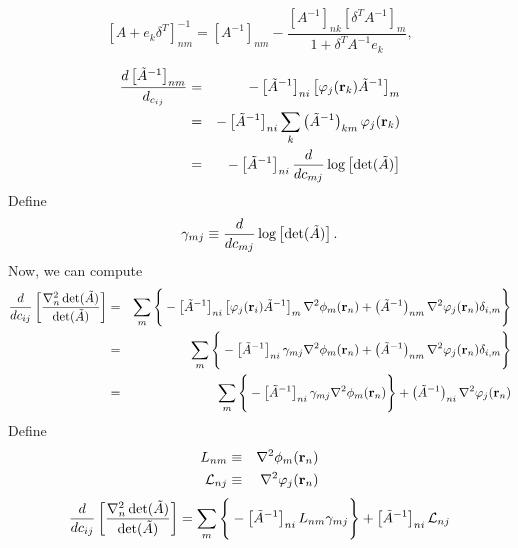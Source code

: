 \documentclass[letterpaper]{article}
\begin{document}
\begin{equation}
\left[A + e_k\delta^T\right]^{-1}_{nm} = \left[A^{-1}\right]_{nm} - \frac{\left[A^{-1}\right]_{nk}\left[\delta^T
  A^{-1}\right]_m}{1 + \delta^T A^{-1}e_k},
\end{equation}

\begin{eqnarray}
\frac{d \left[\tilde{A}^{-1}\right]_{nm}}{d_{c_{ij}}} & = &
-\left[\tilde{A}^{-1}\right]_{ni}\left[\varphi_j(\mathbf{r}_k)\tilde{A}^{-1}\right]_m  \\
& = & -\left[\tilde{A}^{-1}\right]_{ni} \sum_k \left(\tilde{A}^{-1}\right)_{km} \varphi_j(\mathbf{r}_k) \\
& = & -\left[\tilde{A}^{-1}\right]_{ni} \frac{d}{d c_{mj}} \log\left[\det(\tilde{A})\right]
\end{eqnarray}
Define
\begin{equation}
\gamma_{mj} \equiv \frac{d}{d c_{mj}} \log\left[\det(\tilde{A})\right].
\end{equation}
Now, we can compute
\begin{eqnarray}
\frac{d}{dc_{ij}} \left[\frac{\nabla^2_n
    \det(\Aopt)}{\det(\Aopt)}\right] & = & \sum_m \left\{\rule{0cm}{0.6cm}
-\left[\Aopt^{-1}\right]_{ni}\left[\varphi_j(\vr_i)\Aopt^{-1}\right]_m
\nabla^2 \phi_m(\vr_n) +
\left(\Aopt^{-1}\right)_{nm} \nabla^2 \varphi_j(\vr_n)\delta_{i,m} \right\} \nonumber \\
& = & \sum_m \left\{\rule{0cm}{0.6cm}
-\left[\Aopt^{-1}\right]_{ni} \gamma_{mj}
\nabla^2 \phi_m(\vr_n) +
\left(\Aopt^{-1}\right)_{nm} \nabla^2 \varphi_j(\vr_n) \delta_{i,m}\right\} \\ 
& = & \sum_m \left\{\rule{0cm}{0.6cm}
-\left[\Aopt^{-1}\right]_{ni} \gamma_{mj}
\nabla^2 \phi_m(\vr_n) \right\}+
\left(\Aopt^{-1}\right)_{ni} \nabla^2 \varphi_j(\vr_n)
\end{eqnarray}
Define
\begin{eqnarray}
L_{nm} & \equiv & \nabla^2\phi_m(\mathbf{r}_n) \\
\mathcal{L}_{nj} & \equiv & \nabla^2\varphi_j(\mathbf{r}_n)
\end{eqnarray}
\begin{equation}
\frac{d}{dc_{ij}} \left[\frac{\nabla^2_n \det(\Aopt)}{\det(\Aopt)}\right] =
\sum_m  \left\{\rule{0cm}{0.6cm}
-\left[\Aopt^{-1}\right]_{ni} L_{nm} \gamma_{mj} \right\} + \left[\Aopt^{-1}\right]_{ni} \mathcal{L}_{nj}
\end{equation}
\end{document}
